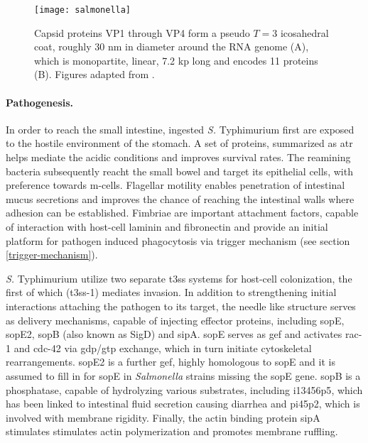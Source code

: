 \begin{figure}[t]
  \centering
  \texttt{[image: salmonella]}
  \caption[Capsid structure and genome of rhinoviruses.]{Capsid proteins VP1 through VP4 form a pseudo $T=3$ icosahedral coat, roughly 30 nm in diameter around the RNA genome (A), which is monopartite, linear, 7.2 kp long and encodes 11 proteins (B). Figures adapted from \cite{Haraga2008}.}
  \label{fig:salmonella}
\end{figure}

\paragraph{Pathogenesis.}
In order to reach the small intestine, ingested \textit{S.} Typhimurium first are exposed to the hostile environment of the stomach. A set of proteins, summarized as \gls{atr} helps mediate the acidic conditions and improves survival rates. The reamining bacteria subsequently reacht the small bowel and target its epithelial cells, with preference towards \gls{m-cells}. Flagellar motility enables penetration of intestinal mucus secretions and improves the chance of reaching the intestinal walls where adhesion can be established. Fimbriae are important attachment factors, capable of interaction with host-cell laminin and fibronectin and provide an initial platform for pathogen induced phagocytosis via trigger mechanism (see section \ref{trigger-mechanism}). 

\textit{S.} Typhimurium utilize two separate \gls{t3ss} systems for host-cell colonization, the first of which (\gls{t3ss}-1) mediates invasion. In addition to strengthening initial interactions attaching the pathogen to its target, the needle like structure serves as delivery mechanisms, capable of injecting effector proteins, including \acrshort{sop}E, \acrshort{sop}E2, \acrshort{sop}B (also known as SigD) and \gls{sip}A. \Acrshort{sop}E serves as \gls{gef} and activates \gls{rac-1} and \gls{cdc-42} via \acrshort{gdp}/\acrshort{gtp} exchange, which in turn initiate cytoskeletal rearrangements. \Acrshort{sop}E2 is a further \gls{gef}, highly homologous to \acrshort{sop}E and it is assumed to fill in for \acrshort{sop}E in \textit{Salmonella} strains missing the \acrshort{sop}E gene. \Acrshort{sop}B is a phosphatase, capable of hydrolyzing various substrates, including \gls{i13456p5}, which has been linked to intestinal fluid secretion causing diarrhea and \gls{pi45p2}, which is involved with membrane rigidity. Finally, the actin binding protein \gls{sip}A  stimulates stimulates actin polymerization and promotes membrane ruffling.

